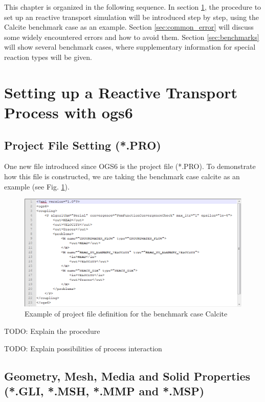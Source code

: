 This chapter is organized in the following sequence. In section \ref{sec:tutorial}, the procedure to set up an reactive transport simulation will be introduced step by step, using the Calcite benchmark case as an example. Section \ref{sec:common_error} will discuss some widely encountered errors and how to avoid them. Section \ref{sec:benchmarks} will show several benchmark cases, where supplementary information for special reaction types will be given. 

\section{Setting up a Reactive Transport Process with ogs6}
\label{sec:tutorial}

\subsection{Project File Setting (*.PRO)}

One new file introduced since OGS6 is the project file (*.PRO). To demonstrate how this file is constructed, we are taking the benchmark case calcite as an example (see Fig. \ref{fig:RT_pro_file}). 

\begin{figure}
\includegraphics[width=\textwidth]{RT/figs/RT_fig_pro_file}
\caption{Example of project file definition for the benchmark case Calcite}
\label{fig:RT_pro_file}
\end{figure}

TODO: Explain the procedure

TODO: Explain possibilities of process interaction


\subsection{Geometry, Mesh, Media and Solid Properties (*.GLI, *.MSH, *.MMP and *.MSP)}

